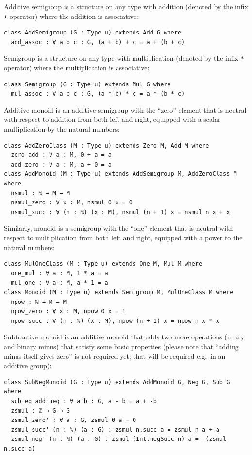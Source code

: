 \documentclass[]{article}
\renewcommand{\.}{\hskip .75pt}
\begin{document}
Additive semigroup is a structure on any type with addition (denoted by the infix \texttt{+} operator) where the addition is associative:
\begin{lstlisting}
class AddSemigroup (G : Type u) extends Add G where
  add_assoc : ∀ a b c : G, (a + b) + c = a + (b + c)
\end{lstlisting}
Semigroup is a structure on any type with multiplication (denoted by the infix \texttt{*} operator) where the multiplication is associative:
\begin{lstlisting}
class Semigroup (G : Type u) extends Mul G where
  mul_assoc : ∀ a b c : G, (a * b) * c = a * (b * c)
\end{lstlisting}
Additive monoid is an additive semigroup with the ``zero'' element that is neutral with respect to addition
from both left and right, equipped with a scalar multiplication by the natural numbers:
\begin{lstlisting}
class AddZeroClass (M : Type u) extends Zero M, Add M where
  zero_add : ∀ a : M, 0 + a = a
  add_zero : ∀ a : M, a + 0 = a
class AddMonoid (M : Type u) extends AddSemigroup M, AddZeroClass M where
  nsmul : ℕ → M → M
  nsmul_zero : ∀ x : M, nsmul 0 x = 0 
  nsmul_succ : ∀ (n : ℕ) (x : M), nsmul (n + 1) x = nsmul n x + x 
\end{lstlisting}
Similarly, monoid is a semigroup with the ``one'' element that is neutral with respect to multiplication
from both left and right, equipped with a power to the natural numbers:
\begin{lstlisting}
class MulOneClass (M : Type u) extends One M, Mul M where
  one_mul : ∀ a : M, 1 * a = a
  mul_one : ∀ a : M, a * 1 = a
class Monoid (M : Type u) extends Semigroup M, MulOneClass M where
  npow : ℕ → M → M
  npow_zero : ∀ x : M, npow 0 x = 1 
  npow_succ : ∀ (n : ℕ) (x : M), npow (n + 1) x = npow n x * x 
\end{lstlisting}
Subtractive monoid is an additive monoid that adds two more operations (unary and binary minus)
that satisfy some basic properties (please note that ``adding minus itself gives zero''
is not required yet; that will be required e.g.~in an additive group):
\begin{lstlisting}
class SubNegMonoid (G : Type u) extends AddMonoid G, Neg G, Sub G where
  sub_eq_add_neg : ∀ a b : G, a - b = a + -b 
  zsmul : ℤ → G → G
  zsmul_zero' : ∀ a : G, zsmul 0 a = 0 
  zsmul_succ' (n : ℕ) (a : G) : zsmul n.succ a = zsmul n a + a
  zsmul_neg' (n : ℕ) (a : G) : zsmul (Int.negSucc n) a = -(zsmul n.succ a)
\end{lstlisting}
\end{document}
